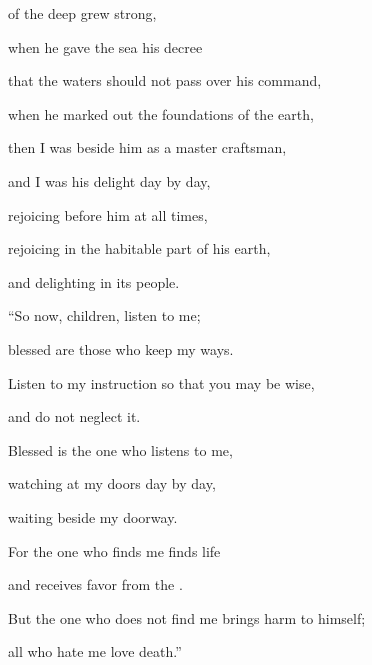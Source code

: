 {of the deep
grew strong,
\par }{\Q {}when he gave
the sea
his decree
\par }{\Q that the waters
should not
pass
over his command,
\par }{\Q when he marked
out the foundations
of the earth,
\par }{\Q {}then
I was beside
him as a master craftsman,
\par }{\Q and I was his delight
day
by day,
\par }{\Q rejoicing
before
him at all
times,
\par }{\Q {}rejoicing
in the habitable part
of his earth,
\par }{\Q and delighting
in its people.
\par }{\Q {}“So now,
children,
listen
to me;
\par }{\Q blessed
are those who keep
my ways.
\par }{\Q {}Listen
to my instruction
so that you may be wise,
\par }{\Q and do not
neglect it.
\par }{\Q {}Blessed
is the one
who listens
to me,
\par }{\Q watching
at my doors
day
by day,
\par }{\Q waiting
beside my doorway.
\par }{\Q {}For
the one who finds
me finds
life
\par }{\Q and receives
favor
from the
{}.
\par }{\Q {}But the one who does not find me brings
harm to himself;
\par }{\Q all
who hate
me love
death.”


}
